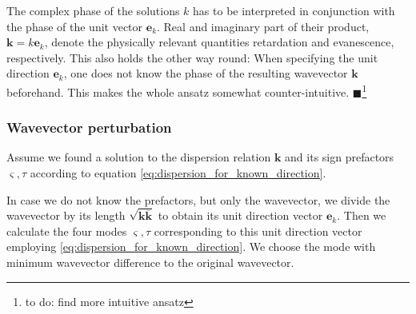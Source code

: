 \documentclass[12pt,a4paper,twoside,openright,BCOR10mm,headsepline,titlepage,abstracton,chapterprefix,final]{scrreprt}
\newcommand\Vector[1]{{\mathbf{#1}}}
\newcommand\wavenumber{k}
\newcommand\Wavevector{\Vector{\wavenumber}}
\newcommand{\remark}[1]{{\color{red}$\blacksquare$}\footnote{{\color{red}#1}}}
\begin{document}
The complex phase of the solutions $\wavenumber$ has to be interpreted
in conjunction with the phase of the unit vector $\Vector{e}_\wavenumber$.
Real and imaginary part of their product, $\Wavevector = \wavenumber \Vector{e}_\wavenumber$, 
denote the physically relevant quantities retardation and evanescence, respectively.
This also holds the other way round: When specifying the unit direction $\Vector{e}_\wavenumber$, 
one does not know the phase of the resulting wavevector $\Wavevector$ beforehand.
This makes the whole ansatz somewhat counter-intuitive.
\remark{to do: find more intuitive ansatz}

\subsubsection{Wavevector perturbation}

Assume we found a solution to the dispersion relation $\Wavevector$ and its sign prefactors $\varsigma, \tau$ according to equation \eqref{eq:dispersion_for_known_direction}.

In case we do not know the prefactors, but only the wavevector, we divide the wavevector by its length $\sqrt{\Wavevector \overline{\Wavevector}}$ 
to obtain its unit direction vector $\Vector{e}_\wavenumber$. 
Then we calculate the four modes $\varsigma, \tau$ corresponding to this unit direction vector employing \eqref{eq:dispersion_for_known_direction}.
We choose the mode with minimum wavevector difference to the original wavevector.
\end{document}
